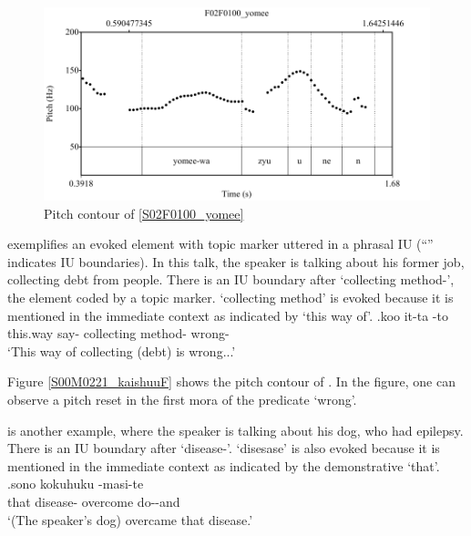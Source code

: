 \begin{figure}
	\begin{center}
	\includegraphics[width=.5\textwidth]{sounds/s02F0100_yomee.pdf}
	\caption{Pitch contour of \ref{S02F0100_yomee}}
	\label{S02F0100_yomeeF}
	\end{center}
\end{figure}

\Next exemplifies an evoked element with topic marker
uttered in a phrasal IU
(``\tp{\dvline}'' indicates IU boundaries).
In this talk, the speaker is talking about his former job,
collecting debt from people.
There is an IU boundary after  `collecting method-', the element coded by a topic marker.
 `collecting method' is evoked because
it is mentioned in the immediate context
as indicated by  `this way of'.
%
\exg.\label{S00M0221_kaishuu}koo it-ta \tp{\dvline}   \tp{\dvline} -to \tp{\dvline} \\
	this.way say- {} collecting method- {} wrong- {} \\
	`This way of collecting (debt) is wrong...'

Figure \ref{S00M0221_kaishuuF} shows the pitch contour of \Last.
In the figure,
one can observe a pitch reset in the first mora of the predicate  `wrong'.

\Next is another example,
where the speaker is talking about his dog,
who had epilepsy.
There is an IU boundary after  `disease-'.
 `disesase' is also evoked because it is mentioned in the immediate context
as indicated by the demonstrative  `that'.
%
\exg.\label{S02M0198_tenkan}sono  \tp{\dvline} {kokuhuku} -masi-te \tp{\dvline} \\
		that disease- {} overcome do--and {} \\
		`(The speaker's dog) overcame that disease.'

